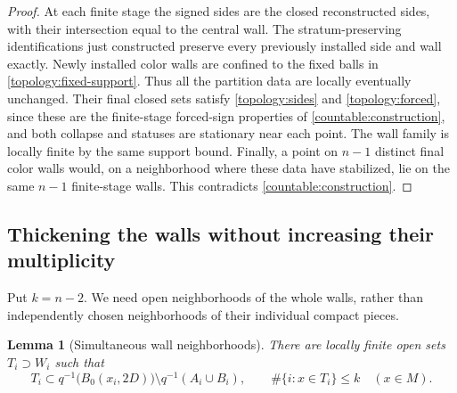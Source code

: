 \documentclass[11pt]{article}
\numberwithin{equation}{section}
\newtheorem{lemma}[theorem]{Lemma}
\theoremstyle{definition}
\theoremstyle{remark}
\begin{document}
\begin{proof}
At each finite stage the signed sides are the closed reconstructed
sides, with their intersection equal to the central wall.  The
stratum-preserving identifications just constructed preserve every
previously installed side and wall exactly.  Newly installed color
walls are confined to the fixed balls in
\eqref{topology:fixed-support}.  Thus all the partition data are locally
eventually unchanged.  Their final closed sets satisfy
\eqref{topology:sides} and \eqref{topology:forced}, since these are the
finite-stage forced-sign properties of
\cref{countable:construction}, and both collapse and statuses are
stationary near each point.  The wall family is locally finite by the
same support bound.  Finally, a point on $n-1$ distinct final color
walls would, on a neighborhood where these data have stabilized, lie
on the same $n-1$ finite-stage walls.  This contradicts
\cref{countable:construction}.
\end{proof}

\subsection{Thickening the walls without increasing their multiplicity}

Put $k=n-2$.  We need open neighborhoods of the whole walls, rather
than independently chosen neighborhoods of their individual compact
pieces.

\begin{lemma}[Simultaneous wall neighborhoods]\label{topology:thicken}
There are locally finite open sets $T_i\supset W_i$ such that
\begin{equation}\label{topology:thickening}
 T_i\subset q^{-1}\bigl(B_0(x_i,2D)\bigr)
                  \setminus q^{-1}(A_i\cup B_i),
 \qquad
 \#\{i:x\in T_i\}\le k\quad(x\in M).
\end{equation}
\end{lemma}
\end{document}
